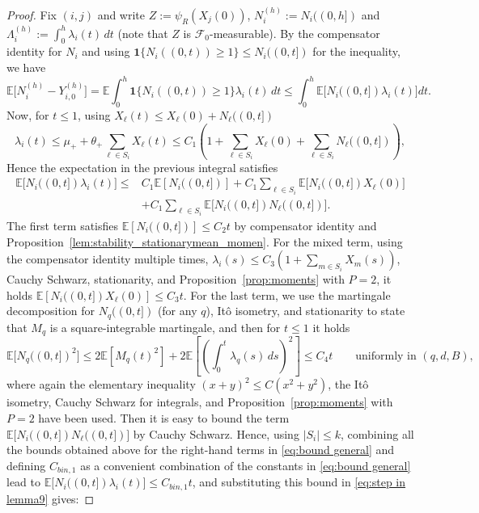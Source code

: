 \documentclass{article}
\newcommand{\E}{\mathbb{E}}
\newcommand{\ind}{\mathbf 1}
\begin{document}
\begin{proof}
Fix $(i,j)$ and write $Z:=\psi_R(X_j(0))$, $N_i^{(h)}:=N_i((0,h])
$ and $\Lambda_i^{(h)}:=\int_0^h \lambda_i(t)\,dt$ (note that $Z$ is $\mathcal F_0$-measurable). By the compensator identity for $N_i$ and using $\ind\{N_i((0,t))\ge 1\}\le N_i((0,t])$ for the inequality, we have
\begin{equation}
    \label{eq:step in lemma9}
    \E\bigl[N_i^{(h)}-Y_{i,0}^{(h)}\bigr]= \E\int_0^h \ind\{N_i((0,t))\ge 1\}\lambda_i(t)\,dt\le \int_0^h \E\bigl[N_i((0,t])\lambda_i(t)\bigr]dt.
\end{equation}
Now, for $t\le 1$, using $X_\ell(t)\le X_\ell(0)+N_\ell((0,t])$
\[
\lambda_i(t)
\le
\mu_+ + \theta_+\sum_{\ell\in S_i}X_\ell(t)
\le
C_1\left(1+\sum_{\ell\in S_i}X_\ell(0)+\sum_{\ell\in S_i}N_\ell((0,t])\right),
\]
Hence the expectation in the previous integral satisfies 
\begin{equation}
\label{eq:bound general}
\begin{split}
    \mathbb{E} \bigl[ N_i((0,t]) \lambda_i(t) \bigr] 
    \le{} & C_1 \mathbb{E} [N_i((0,t])] + C_1 \sum_{\ell \in S_i} \mathbb{E} \bigl[ N_i((0,t]) X_\ell(0) \bigr] \\
    & + C_1 \sum_{\ell \in S_i} \mathbb{E} \bigl[ N_i((0,t]) N_\ell((0,t]) \bigr].
\end{split}
\end{equation}
The first term satisfies $\E[N_i((0,t])]\le C_2t$ by compensator identity and Proposition~\ref{lem:stability_stationarymean_momen}. For the mixed term, using the compensator identity multiple times, $\lambda_i(s)\le C_3(1+\sum_{m\in S_i}X_m(s))$, Cauchy Schwarz, stationarity, and Proposition~\ref{prop:moments} with $P=2$, it holds $\E[N_i((0,t])X_\ell(0)]\le C_3t$. For the last term, we use the martingale decomposition for $N_q((0,t])$ (for any $q$), It\^{o} isometry, and stationarity to state that $M_q$ is a square-integrable martingale, and then for $t\le 1$ it holds 
\[
\E\bigl[N_q((0,t])^2\bigr]
\le
2\E[M_q(t)^2] + 2\E\left[\left(\int_0^t \lambda_q(s)\,ds\right)^2\right]
\le C_4t \qquad \text{uniformly in } (q,d,B),
\]
where again the elementary inequality $(x+y)^2\le C(x^2+y^2)$, the It\^{o} isometry, Cauchy Schwarz for integrals, and Proposition~\ref{prop:moments} with $P=2$ have been used. Then it is easy to bound the term $\E\bigl[N_i((0,t])N_\ell((0,t])\bigr]$ by Cauchy Schwarz. Hence, using $|S_i|\le k$, combining all the bounds obtained above for the right-hand terms in \eqref{eq:bound general} and defining $C_{bin,1}$ as a convenient combination of the constants in \eqref{eq:bound general} lead to $\E\bigl[N_i((0,t])\lambda_i(t)\bigr]\le C_{bin,1}t$,  and substituting this bound in \eqref{eq:step in lemma9} gives:

\end{proof}
\end{document}
